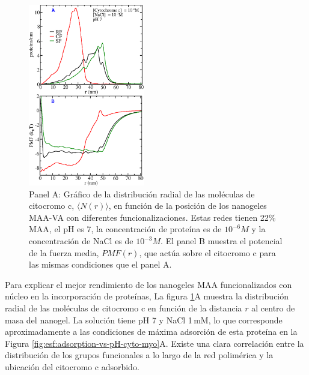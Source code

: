 
\begin{figure}[!htb]
     \centering
     \includegraphics[width=0.45\textwidth]{Figures/graphs-gel2/cyto-adsr-pmf.png}
     \caption{Panel A: Gr\'afico de la distribuci\'on radial de las mol\'eculas de citocromo c, $\langle N(r)\rangle$, en funci\'on de la posici\'on de los nanogeles MAA-VA con diferentes funcionalizaciones.
     	Estas redes tienen 22\% MAA, el pH es 7, la concentraci\'on de prote\'ina es de $10^{-6}M$ y la concentraci\'on de NaCl es de $10^{-3}M$.
     	El panel B muestra el potencial de la fuerza media, ${PMF}(r)$, que act\'ua sobre el citocromo c para las mismas condiciones que el panel A.}
     \label{fig:esf:adsorption-vs-r-cyto}
 \end{figure}



Para explicar el mejor rendimiento de los nanogeles MAA funcionalizados con n\'ucleo en la incorporaci\'on de prote\'inas,
La figura \ref{fig:esf:adsorption-vs-r-cyto}A muestra la distribuci\'on radial de las mol\'eculas de citocromo c en funci\'on de la distancia $r$ al centro de masa del nanogel.
La soluci\'on tiene pH 7 y NaCl 1\,mM, lo que corresponde aproximadamente a las condiciones de m\'axima adsorci\'on de esta prote\'ina en la Figura \ref{fig:esf:adsorption-vs-pH-cyto-myo}A.
Existe una clara correlaci\'on entre la distribuci\'on de los grupos funcionales a lo largo de la red polim\'erica y la ubicaci\'on del citocromo c adsorbido.



